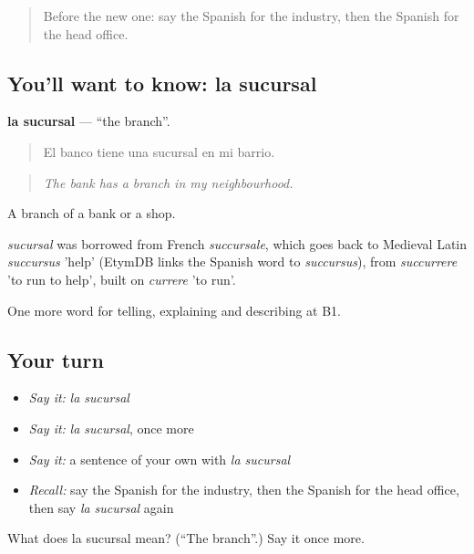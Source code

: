 \label{lesson:ES-C592-sucursal}



\begin{quote}
Before the new one: say the Spanish for the industry, then the Spanish for the head office.
\end{quote}

\subsection*{You'll want to know: la sucursal}
\textbf{la sucursal} — \textquotedblleft{}the branch\textquotedblright{}.

\begin{quote}
El banco tiene una sucursal en mi barrio.
\end{quote}

\begin{quote}
\emph{The bank has a branch in my neighbourhood.}
\end{quote}

A branch of a bank or a shop.

\begin{cousinweb}
\emph{sucursal} was borrowed from French \emph{succursale}, which goes back to Medieval Latin \emph{succursus} 'help' (EtymDB links the Spanish word to \emph{succursus}), from \emph{succurrere} 'to run to help', built on \emph{currere} 'to run'.
\end{cousinweb}

\begin{grammarlens}[title={What you've built}]
One more word for telling, explaining and describing at B1.
\end{grammarlens}

\subsection*{Your turn}
\begin{itemize}
\raggedright
  \item \emph{Say it:} \emph{la sucursal}
  \item \emph{Say it:} \emph{la sucursal}, once more
  \item \emph{Say it:} a sentence of your own with \emph{la sucursal}
  \item \emph{Recall:} say the Spanish for the industry, then the Spanish for the head office, then say \emph{la sucursal} again
\end{itemize}

\begin{tcolorbox}[breakable,colback=teal!4,colframe=teal!35!black,title={Before you move on}]
What does la sucursal mean? (\textquotedblleft{}The branch\textquotedblright{}.) Say it once more.
\end{tcolorbox}
